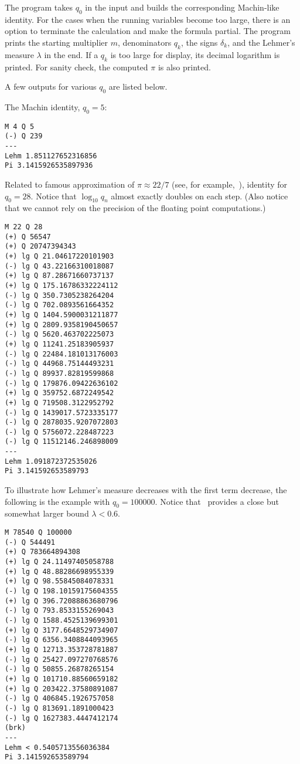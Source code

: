 \documentclass[draft, 10pt]{article} %
\begin{document}
The program takes $q_0$ in the input and builds the corresponding Machin-like identity.
For the cases when the running variables become too large, there is an option
to terminate the calculation and make the formula partial. The program prints the starting
multiplier $m$, denominators $q_k$, the signs $\delta_k$, and the Lehmer's
measure $\lambda$ in the end. If a $q_k$ is too large for display, its decimal logarithm
is printed. For sanity check, the computed $\pi$ is also printed.

A few outputs for various $q_0$ are listed below.

The Machin identity, $q_0 = 5$:
\begin{verbatim}
M 4 Q 5
(-) Q 239
---
Lehm 1.851127652316856
Pi 3.1415926535897936
\end{verbatim}

Related to famous approximation of $\pi \approx 22/7$ (see, for example,~\cite{source-pi}),
identity for $q_0 = 28$. Notice that $\log_{10} q_n$ almost exactly doubles on each step.
(Also notice that we cannot rely on the precision of the floating point computations.)
\begin{verbatim}
M 22 Q 28
(+) Q 56547
(+) Q 20747394343
(+) lg Q 21.04617220101903
(-) lg Q 43.22166310018087
(+) lg Q 87.28671660737137
(+) lg Q 175.16786332224112
(-) lg Q 350.7305238264204
(-) lg Q 702.0893561664352
(+) lg Q 1404.5900031211877
(+) lg Q 2809.9358190450657
(-) lg Q 5620.463702225073
(+) lg Q 11241.25183905937
(-) lg Q 22484.181013176003
(-) lg Q 44968.75144493231
(-) lg Q 89937.82819599868
(-) lg Q 179876.09422636102
(+) lg Q 359752.6872249542
(+) lg Q 719508.3122952792
(-) lg Q 1439017.5723335177
(-) lg Q 2878035.9207072803
(-) lg Q 5756072.228487223
(-) lg Q 11512146.246898009
---
Lehm 1.091872372535026
Pi 3.141592653589793
\end{verbatim}

\pagebreak
To illustrate how Lehmer's measure decreases with the first term decrease, the following is
the example with $q_0 = 100000$. Notice that~ provides a close but
somewhat larger bound $\lambda < 0.6$.

\begin{verbatim}
M 78540 Q 100000
(-) Q 544491
(+) Q 783664894308
(+) lg Q 24.11497405058788
(+) lg Q 48.88286698955339
(+) lg Q 98.55845084078331
(-) lg Q 198.10159175604355
(+) lg Q 396.72088863680796
(-) lg Q 793.8533155269043
(-) lg Q 1588.4525139699301
(+) lg Q 3177.6648529734907
(-) lg Q 6356.3408844093965
(+) lg Q 12713.353728781887
(-) lg Q 25427.097270768576
(-) lg Q 50855.26878265154
(+) lg Q 101710.88560659182
(+) lg Q 203422.37580891087
(-) lg Q 406845.1926757058
(-) lg Q 813691.1891000423
(-) lg Q 1627383.4447412174
(brk)
---
Lehm < 0.5405713556036384
Pi 3.141592653589794
\end{verbatim}
\end{document}
